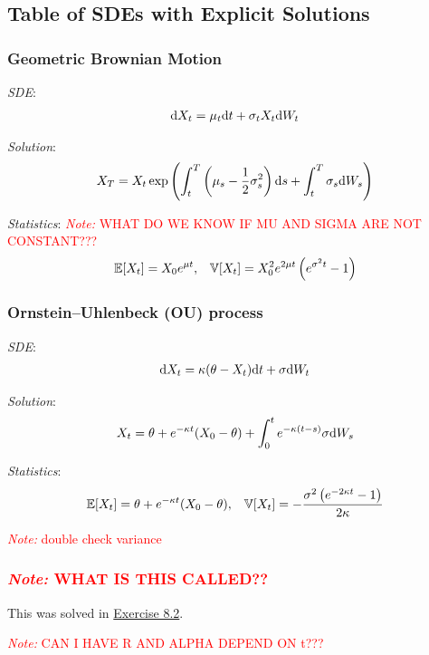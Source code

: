 \documentclass[12pt]{article}
\newcommand{\note}[1]{\textcolor{red}{\textit{Note:} #1}}
\begin{document}
\subsection{Table of SDEs with Explicit Solutions}
\subsubsection{Geometric Brownian Motion}
\textit{SDE}:
\begin{align*}
    \mathrm{d} X_t = \mu_t \mathrm{d} t + \sigma_t X_t \mathrm{d} W_t
\end{align*}

\textit{Solution}:
\begin{align*}
    X_T = X_t  \exp\left( \int_t^T \left( \mu_s - \frac{1}{2}\sigma_s^2\right)\mathrm{d} s + \int_t^T\sigma_s \mathrm{d} W_s \right)
\end{align*}

\textit{Statistics}:
\note{WHAT DO WE KNOW IF MU AND SIGMA ARE NOT CONSTANT???}
\begin{align*}
    \mathbb{E}[X_t] = X_0 e^{\mu t} 
    ,&&
    \mathbb{V}[X_t] = X_0^2 e^{2\mu t} \left( e^{\sigma^2 t}-1 \right)
\end{align*}


\subsubsection{Ornstein--Uhlenbeck (OU) process}
\textit{SDE}:
\begin{align*}
    \mathrm{d} X_t = \kappa(\theta-X_t)\mathrm{d} t + \sigma \mathrm{d} W_t
\end{align*}

\textit{Solution}:
\begin{align*}
    X_t = \theta + e^{-\kappa t}(X_0-\theta) + \int_0^t e^{-\kappa(t-s)}\sigma \mathrm{d} W_s
\end{align*}

\textit{Statistics}:
\begin{align*}
    \mathbb{E}[X_t] =  \theta + e^{-\kappa t}(X_0 - \theta)
    ,&&
    \mathbb{V}[X_t] = -\frac{\sigma ^2 \left(e^{-2 \kappa  t}-1\right)}{2 \kappa } 
\end{align*}

\note{double check variance}

\subsubsection{\note{WHAT IS THIS CALLED??}}
This was solved in \hyperref[Exercise 8.2]{Exercise 8.2}.

\note{CAN I HAVE R AND ALPHA DEPEND ON t???}
\end{document}
